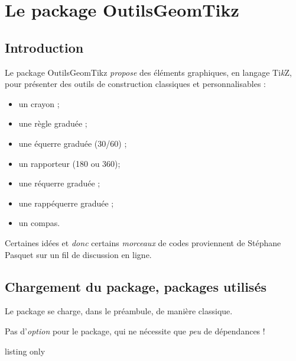 \documentclass[french,a4paper,11pt]{article}
\providecommand\tikzlogo{Ti\textit{k}Z}
\let\TikZ\tikzlogo
\begin{document}
\section{Le package OutilsGeomTikz}

\subsection{Introduction}

\begin{noteblock}
Le package \textsf{OutilsGeomTikz} \textit{propose} des éléments graphiques, en langage \TikZ, pour présenter des outils de construction classiques et personnalisables :

\begin{itemize}
	\item un crayon ;
	\item une règle graduée ;
	\item une équerre graduée (30/60) ;
	\item un rapporteur (180 ou 360);
	\item une réquerre graduée ;
	\item une \og rappéquerre \fg{} graduée ;
	\item un compas.
\end{itemize}
\vspace*{-\baselineskip}\leavevmode
\end{noteblock}

\begin{cautionblock}
Certaines idées et \textit{donc} certains \textit{morceaux} de codes proviennent de Stéphane Pasquet\footnotemark{} sur un fil de discussion en ligne.
\end{cautionblock}

\subsection{Chargement du package, packages utilisés}

\begin{importantblock}
Le package se charge, dans le préambule, de manière classique.

Pas d'\textit{option} pour le package, qui ne nécessite que \textit{peu} de dépendances !
\end{importantblock}

\begin{PresentationCode}{listing only}
\usepackage{OutilsGeomTikz}
\end{PresentationCode}
\end{document}
